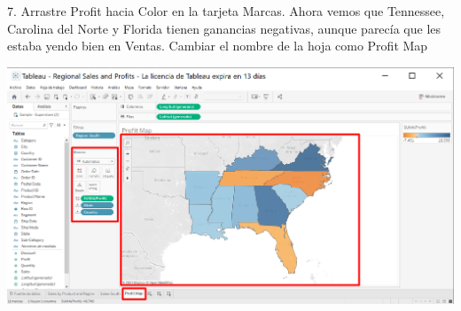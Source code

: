 \documentclass[12pt,letterpaper]{article}
\begin{document}
7. Arrastre Profit hacia Color en la tarjeta Marcas. Ahora vemos que Tennessee, Carolina del
Norte y Florida tienen ganancias negativas, aunque parecía que les estaba yendo bien en
Ventas. Cambiar el nombre de la hoja como Profit Map
\begin{center}
    \includegraphics[width=16cm]{img/26.png}  
\end{center}
\end{document}
